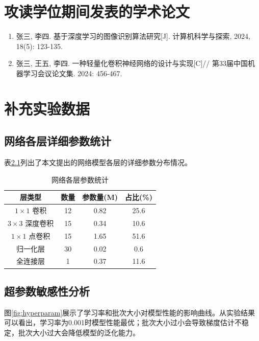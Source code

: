 
\chapter{攻读学位期间发表的学术论文}

\begin{enumerate}
    \item 张三, 李四. 基于深度学习的图像识别算法研究[J]. 计算机科学与探索, 2024, 18(5): 123-135.
    \item 张三, 王五, 李四. 一种轻量化卷积神经网络的设计与实现[C]// 第33届中国机器学习会议论文集. 2024: 456-467.
\end{enumerate}

\chapter{补充实验数据}

\section{网络各层详细参数统计}

表\ref{tab:layer_params}列出了本文提出的网络模型各层的详细参数分布情况。

\begin{table}[htbp]
    \centering
    \caption{网络各层参数统计}
    \begin{tabular}{cccc}
        \toprule
        \textbf{层类型} & \textbf{数量} & \textbf{参数量(M)} & \textbf{占比(\%)} \\
        \midrule
        $1\times1$ 卷积 & 12 & 0.82 & 25.6 \\
        $3\times3$ 深度卷积 & 15 & 0.34 & 10.6 \\
        $1\times1$ 点卷积 & 15 & 1.65 & 51.6 \\
        归一化层 & 30 & 0.02 & 0.6 \\
        全连接层 & 1 & 0.37 & 11.6 \\
        \bottomrule
    \end{tabular}
    \label{tab:layer_params}
\end{table}

\section{超参数敏感性分析}

图\ref{fig:hyperparam}展示了学习率和批次大小对模型性能的影响曲线。从实验结果可以看出，学习率为0.001时模型性能最优；批次大小过小会导致梯度估计不稳定，批次大小过大会降低模型的泛化能力。

